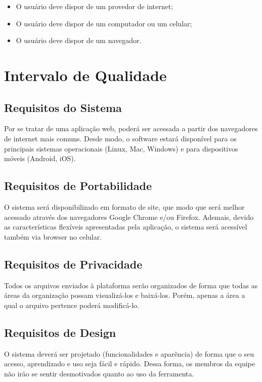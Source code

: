 \begin{apendicesenv}
\begin{itemize}
  \item O usuário deve dispor de um provedor de internet;
  \item O usuário deve dispor de um computador ou um celular;
  \item O usuário deve dispor de um navegador.
\end{itemize}

\section{Intervalo de Qualidade}
\subsection{Requisitos do Sistema}
Por se tratar de uma aplicação web, poderá ser acessada a partir dos navegadores de internet mais comuns. Desde modo, o software estará disponível para os principais sistemas operacionais (Linux, Mac, Windows) e para dispositivos móveis (Android, iOS).

\subsection{Requisitos de Portabilidade}
O sistema será disponibilizado em formato de site, que modo que será melhor acessado através dos navegadores Google Chrome e/ou Firefox. Ademais, devido as características flexíveis apresentadas pela aplicação, o sistema será acessível também via browser no celular.

\subsection{Requisitos de Privacidade}
Todos os arquivos enviados à plataforma serão organizados de forma que todas as áreas da organização possam visualizá-los e baixá-los. Porém, apenas a área a qual o arquivo pertence poderá modificá-lo.

\subsection{Requisitos de Design}
O sistema deverá ser projetado (funcionalidades e aparência) de forma que o seu acesso, aprendizado e uso seja fácil e rápido. Dessa forma, os membros da equipe não irão se sentir desmotivados quanto ao uso da ferramenta.








\end{apendicesenv}
